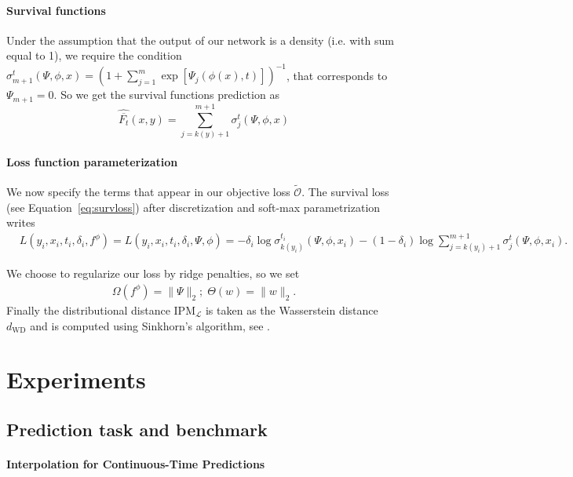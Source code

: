 \documentclass[12pt]{article}
\theoremstyle{plain}
\theoremstyle{definition}
\theoremstyle{remark}
\begin{document}
\paragraph{Survival functions}
Under the assumption that the output of our network is a density (i.e. with sum equal to 1), we require the condition $ \sigma ^{t}_{m+1}( \Psi ,\phi ,x) = (1+\sum ^{m}_{j=1}\exp[ \Psi_{j}( \phi ( x) ,t)])^{-1}$, that corresponds to $\Psi_{m+1}=0$.
So we get the survival functions prediction as 
\begin{equation*}
   \widehat{\overline{F_{t}}}( x,y) =\sum ^{m+1}_{j=k(y)+1} \sigma ^{t}_{j}( \Psi ,\phi ,x)  
\end{equation*}



\paragraph{Loss function parameterization}
We now specify the terms that appear in our objective loss $ \mathcal{\tilde{O}}$. The survival loss (see Equation~\eqref{eq:survloss}) after discretization and soft-max parametrization writes
\begin{align*}
    &L(y_i,x_i,t_i,\delta_i,f^\phi)=L(y_i,x_i,t_i,\delta_i,\Psi ,\phi)=- \delta _{i}\log \sigma ^{t_i}_{k(y_i)}( \Psi ,\phi ,x_i) - ( 1-\delta _{i})  \log \sum ^{m+1}_{j={k(y_i)}+1} \sigma ^{t}_{j}( \Psi ,\phi ,x_i).
\end{align*}

We choose to regularize our loss by ridge penalties, so we set
\begin{align*}
    \Omega(f^\phi)=  \| \Psi \|_2; \;\Theta(w)=\| w \|_2.
\end{align*}
Finally the distributional distance $\text{IPM}_{\mathcal{L}}$ is taken as the Wasserstein distance $ d_{\text{WD}}$ and is computed using Sinkhorn's algorithm, see \cite{Cuturi2013SinkhornDL}.

\section{ Experiments}
\label{experiments}
\subsection{Prediction task and benchmark}


\paragraph{Interpolation for Continuous-Time Predictions}
\end{document}
